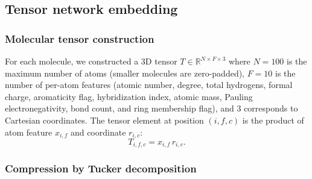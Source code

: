 \documentclass[11pt,a4paper]{article}
\begin{document}
\subsection{Tensor network embedding}

\subsubsection{Molecular tensor construction}

For each molecule, we constructed a 3D tensor $T \in \mathbb{R}^{N \times F \times 3}$ where $N = 100$ is the maximum number of atoms (smaller molecules are zero-padded), $F = 10$ is the number of per-atom features (atomic number, degree, total hydrogens, formal charge, aromaticity flag, hybridization index, atomic mass, Pauling electronegativity, bond count, and ring membership flag), and 3 corresponds to Cartesian coordinates. The tensor element at position $(i, f, c)$ is the product of atom feature $x_{i,f}$ and coordinate $r_{i,c}$:
\begin{equation}
T_{i,f,c} = x_{i,f} \, r_{i,c}.
\end{equation}

\subsubsection{Compression by Tucker decomposition}
\end{document}
